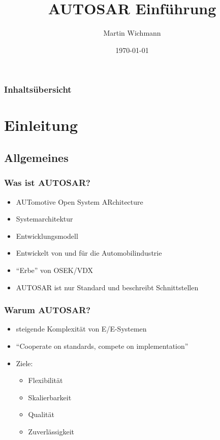 \documentclass[]{beamer}
\author{Martin Wichmann}
\title{AUTOSAR Einführung}
\date{\today}
\institute{Ostfalia Hochschule für angewandte Wissenschaften}
\begin{document}
\begin{frame}
\maketitle
\end{frame}


\begin{frame}
\frametitle{Inhaltsübersicht}
\tableofcontents[hideallsubsections] %
\end{frame}





\section{Einleitung}
\label{sec:einleitung}

\subsection{Allgemeines}
\label{sec:allgemeines}

\begin{frame}
\frametitle{Was ist AUTOSAR?}
    \begin{itemize}
        \item AUTomotive Open System ARchitecture
        \item Systemarchitektur
        \item Entwicklungsmodell
        \item Entwickelt von und für die Automobilindustrie
        \item "`Erbe"' von OSEK/VDX
        \item AUTOSAR ist nur Standard und beschreibt Schnittstellen
    \end{itemize}
\end{frame}

\begin{frame}
\frametitle{Warum AUTOSAR?}
    \begin{itemize}
        \item steigende Komplexität von E/E-Systemen
        \item "`Cooperate on standards, compete on implementation"'
        \item Ziele:
        \begin{itemize}
            \item Flexibilität
            \item Skalierbarkeit
            \item Qualität
            \item Zuverlässigkeit
        \end{itemize}
    \end{itemize}
\end{frame}
\end{document}
